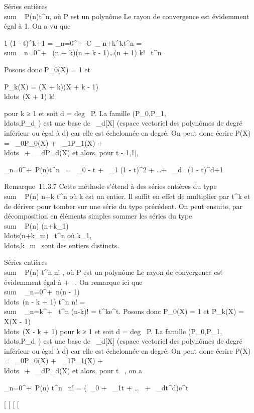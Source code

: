 \documentclass[]{article}
\begin{document}
Séries entières \\sum ~
P(n)t^n, où P est un polynôme Le rayon de convergence est
évidemment égal à 1. On a vu que

 1 \over (1 - t)^k+1 =
\sum \_n=0^+\infty~C~\_
n+k^kt^n = \\sum
\_n=0^+\infty~ (n + k)(n + k -
1)\ldots(n + 1) \over k!~
t^n

Posons donc P\_0(X) = 1 et

P\_k(X) = (X + k)(X + k -
1)\\ldots~(X + 1)
\over k!

pour k ≥ 1 et soit d = deg~ P. La famille
(P\_0,P\_1,\\ldots,P\_d~)
est une base de ~\_d{[}X{]} (espace vectoriel des polynômes de
degré inférieur ou égal à d) car elle est échelonnée en degré. On peut
donc écrire P(X) = \lambda~\_0P\_0(X) +
\lambda~\_1P\_1(X) +
\\ldots~ +
\lambda~\_dP\_d(X) et alors, pour t \in{]} - 1,1{[},

\sum \_n=0^+\infty~P(n)t^n~
= \lambda~\_0  - t + \lambda~\_1
\over (1 - t)^2 +
\ldots + \lambda~\_d~ \over
(1 - t)^d+1

Remarque~11.3.7 Cette méthode s'étend à des séries entières du type
\\sum ~  P(n)
\over n+k t^n où k est un entier. Il suffit
en effet de multiplier par t^k et de dériver pour tomber sur
une série du type précédent. On peut ensuite, par décomposition en
éléments simples sommer les séries du type
\\sum ~  P(n)
\over
(n+k\_1)\\ldots(n+k\_m)~
t^n où
k\_1,\\ldots,k\_m~
sont des entiers distincts.

Séries entières \\sum ~
P(n) t^n \over n! , où P est un polynôme
Le rayon de convergence est évidemment égal à + \infty~. On remarque ici que
\\sum ~
\_n=0^+\infty~n(n -
1)\\ldots~(n - k +
1) t^n \over n!
= \\sum ~
\_n=k^+\infty~ t^n \over (n-k)! =
t^ke^t. Posons donc P\_0(X) = 1 et
P\_k(X) = X(X -
1)\\ldots~(X - k +
1) pour k ≥ 1 et soit d = deg~ P. La famille
(P\_0,P\_1,\\ldots,P\_d~)
est une base de ~\_d{[}X{]} (espace vectoriel des polynômes de
degré inférieur ou égal à d) car elle est échelonnée en degré. On peut
donc écrire P(X) = \lambda~\_0P\_0(X) +
\lambda~\_1P\_1(X) +
\\ldots~ +
\lambda~\_dP\_d(X) et alors, pour t \in {}~, on a

\sum \_n=0^+\infty~P(n) t^n~
\over n! = (\lambda~\_0 + \lambda~\_1t +
\ldots~ +
\lambda~\_dt^d)e^t

{[}
{[}
{[}
{[}
\end{document}
